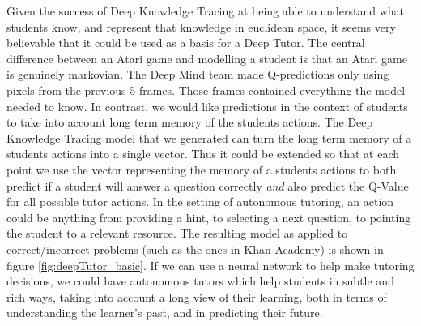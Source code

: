 Given the success of Deep Knowledge Tracing at being able to understand what students know, and represent that knowledge in euclidean space, it seems very believable that it could be used as a basis for a Deep Tutor. The central difference between an Atari game and modelling a student is that an Atari game is genuinely markovian. The Deep Mind team made Q-predictions only using pixels from the previous 5 frames. Those frames contained everything the model needed to know. In contrast, we would like predictions in the context of students to take into account long term memory of the students actions. The Deep Knowledge Tracing model that we generated can turn the long term memory of a students actions into a single vector. Thus it could be extended so that at each point we use the vector representing the memory of a students actions to both predict if a student will answer a question correctly \emph{and} also predict the Q-Value for all possible tutor actions. In the setting of autonomous tutoring, an action could be anything from providing a hint, to selecting a next question, to pointing the student to a relevant resource. The resulting model as applied to correct/incorrect problems (such as the ones in Khan Academy) is shown in figure \ref{fig:deepTutor_basic}. If we can use a neural network to help make tutoring decisions, we could have autonomous tutors which help students in subtle and rich ways, taking into account a long view of their learning, both in terms of understanding the learner's past, and in predicting their future.


